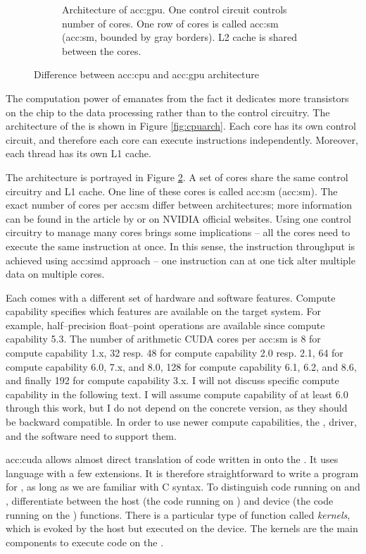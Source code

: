 \begin{figure}
\begin{subfigure}[t]{0.47\textwidth}
        \caption{Architecture of \acrshort*{acc:gpu}. One control circuit controls number of cores. One row of cores is called \acrlong{acc:sm} (\acrshort{acc:sm}, bounded by gray borders). L2 cache is shared between the cores.}
        \label{fig:gpuarch}
    \end{subfigure}
    \caption{Difference between \acrshort*{acc:cpu} and \acrshort*{acc:gpu} architecture}
\end{figure}

The computation power of \gpu emanates from the fact it dedicates more transistors on the chip to the data processing rather than to the control circuitry. The architecture of the \cpu is shown in Figure \ref{fig:cpuarch}. Each core has its own control circuit, and therefore each core can execute instructions independently. Moreover, each thread has its own L1 cache.

The \gpu{} architecture is portrayed in Figure \ref{fig:gpuarch}. A set of cores share the same control circuitry and L1 cache. One line of these cores is called \acrlong*{acc:sm} (\acrshort{acc:sm}). The exact number of cores per \acrshort{acc:sm} differ between architectures; more information can be found in the article by \citet{NVIDIAhistory} or on NVIDIA official websites. Using one control circuitry to manage many cores brings some implications -- all the cores need to execute the same instruction at once. In this sense, the instruction throughput is achieved using \acrfull{acc:simd} approach -- one instruction can at one tick alter multiple data on multiple cores.

Each \gpu comes with a different set of hardware and software features. Compute capability specifies which features are available on the target system. For example, half--precision float--point operations are available since compute capability 5.3. The number of arithmetic CUDA cores per \acrshort{acc:sm} is 8 for compute capability 1.x, 32 resp. 48 for compute capability 2.0 resp. 2.1, 64 for compute capability 6.0, 7.x, and 8.0, 128 for compute capability 6.1, 6.2, and 8.6, and finally 192 for compute capability 3.x. I will not discuss specific compute capability in the following text. I will assume compute capability of at least 6.0 through this work, but I do not depend on the concrete version, as they should be backward compatible. In order to use newer compute capabilities, the \gpuns, driver, and the software need to support them.

\acrlong{acc:cuda} allows almost direct translation of code written in \cpp onto the \gpuns. It uses \cpp language with a few extensions. It is therefore straightforward to write a program for \gpuns, as long as we are familiar with C syntax. To distinguish code running on \cpu and \gpuns, \cuda differentiate between the host (the code running on \cpuns) and device (the code running on the \gpuns) functions. There is a particular type of function called \emph{kernels}, which is evoked by the host but executed on the device. The kernels are the main components to execute code on the \gpuns.

